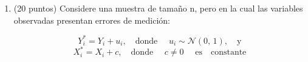 \documentclass{article} %
\begin{document}
{\begin{enumerate}
\begin{enumerate}
    \item  (7 puntos) Halle el valor del coeficiente $\hat{\beta}$ en un modelo de regresión lineal simple que explique el salario en función de la variable dicotómica ``capacitación'' (1 = capacitado, 0 = no capacitado).
    \item  (8 puntos) Se sabe que las \textit{desviaciones estándar} del salario para el grupo capacitado y para el no capacitado  son  US\$250  y  US\$200 respectivamente. Con un nivel de confianza del 95\%, ¿es estadísticamente significativa la diferencia de medias entre ambos grupos?
\end{enumerate}
    





\item (20 puntos) Considere una muestra de tamaño n, pero en la cual las variables observadas presentan errores de medición:

\[
Y_i^* = Y_i + u_i, \quad \text{donde } \quad u_i \sim \mathcal{N}(0,\,1), \quad \text{y}
\]
\[
X_i^* = X_i + c, \quad \text{donde } \quad c \neq 0 \quad \text{ es} \quad  \text{constante}
\]


\end{enumerate}}
\end{document}

